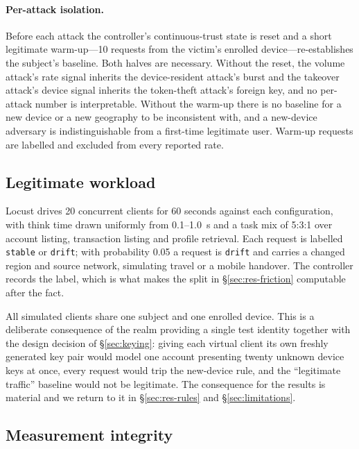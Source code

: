 \paragraph{Per-attack isolation.} Before each attack the controller's continuous-trust state is reset and a short legitimate warm-up---10 requests from the victim's enrolled device---re-establishes the subject's baseline. Both halves are necessary. Without the reset, the volume attack's rate signal inherits the device-resident attack's burst and the takeover attack's device signal inherits the token-theft attack's foreign key, and no per-attack number is interpretable. Without the warm-up there is no baseline for a new device or a new geography to be inconsistent with, and a new-device adversary is indistinguishable from a first-time legitimate user. Warm-up requests are labelled and excluded from every reported rate.

\subsection{Legitimate workload}
\label{sec:method-workload}

Locust drives 20 concurrent clients for 60 seconds against each configuration, with think time drawn uniformly from 0.1--1.0~s and a task mix of 5:3:1 over account listing, transaction listing and profile retrieval. Each request is labelled \texttt{stable} or \texttt{drift}; with probability 0.05 a request is \texttt{drift} and carries a changed region and source network, simulating travel or a mobile handover. The controller records the label, which is what makes the split in \S\ref{sec:res-friction} computable after the fact.

All simulated clients share one subject and one enrolled device. This is a deliberate consequence of the realm providing a single test identity together with the design decision of \S\ref{sec:keying}: giving each virtual client its own freshly generated key pair would model one account presenting twenty unknown device keys at once, every request would trip the new-device rule, and the ``legitimate traffic'' baseline would not be legitimate. The consequence for the results is material and we return to it in \S\ref{sec:res-rules} and \S\ref{sec:limitations}.

\subsection{Measurement integrity}
\label{sec:integrity}

